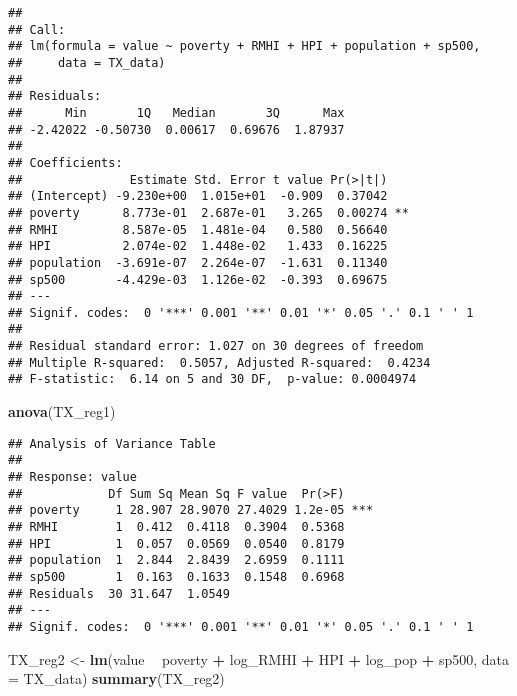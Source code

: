 \documentclass[
]{article}
\newenvironment{Shaded}{\begin{snugshade}}{\end{snugshade}}
\newcommand{\DataTypeTok}[1]{\textcolor[rgb]{0.13,0.29,0.53}{#1}}
\newcommand{\KeywordTok}[1]{\textcolor[rgb]{0.13,0.29,0.53}{\textbf{#1}}}
\newcommand{\NormalTok}[1]{#1}
\newcommand{\OperatorTok}[1]{\textcolor[rgb]{0.81,0.36,0.00}{\textbf{#1}}}
\newcommand{\StringTok}[1]{\textcolor[rgb]{0.31,0.60,0.02}{#1}}
\begin{document}
\begin{verbatim}
## 
## Call:
## lm(formula = value ~ poverty + RMHI + HPI + population + sp500, 
##     data = TX_data)
## 
## Residuals:
##      Min       1Q   Median       3Q      Max 
## -2.42022 -0.50730  0.00617  0.69676  1.87937 
## 
## Coefficients:
##               Estimate Std. Error t value Pr(>|t|)   
## (Intercept) -9.230e+00  1.015e+01  -0.909  0.37042   
## poverty      8.773e-01  2.687e-01   3.265  0.00274 **
## RMHI         8.587e-05  1.481e-04   0.580  0.56640   
## HPI          2.074e-02  1.448e-02   1.433  0.16225   
## population  -3.691e-07  2.264e-07  -1.631  0.11340   
## sp500       -4.429e-03  1.126e-02  -0.393  0.69675   
## ---
## Signif. codes:  0 '***' 0.001 '**' 0.01 '*' 0.05 '.' 0.1 ' ' 1
## 
## Residual standard error: 1.027 on 30 degrees of freedom
## Multiple R-squared:  0.5057, Adjusted R-squared:  0.4234 
## F-statistic:  6.14 on 5 and 30 DF,  p-value: 0.0004974
\end{verbatim}

\begin{Shaded}
\begin{Highlighting}[]
\KeywordTok{anova}\NormalTok{(TX_reg1)}
\end{Highlighting}
\end{Shaded}

\begin{verbatim}
## Analysis of Variance Table
## 
## Response: value
##            Df Sum Sq Mean Sq F value  Pr(>F)    
## poverty     1 28.907 28.9070 27.4029 1.2e-05 ***
## RMHI        1  0.412  0.4118  0.3904  0.5368    
## HPI         1  0.057  0.0569  0.0540  0.8179    
## population  1  2.844  2.8439  2.6959  0.1111    
## sp500       1  0.163  0.1633  0.1548  0.6968    
## Residuals  30 31.647  1.0549                    
## ---
## Signif. codes:  0 '***' 0.001 '**' 0.01 '*' 0.05 '.' 0.1 ' ' 1
\end{verbatim}

\begin{Shaded}
\begin{Highlighting}[]
\NormalTok{TX_reg2 <-}\StringTok{ }\KeywordTok{lm}\NormalTok{(value }\OperatorTok{~}\StringTok{ }\NormalTok{poverty }\OperatorTok{+}\StringTok{ }\NormalTok{log_RMHI }\OperatorTok{+}\StringTok{ }\NormalTok{HPI }\OperatorTok{+}\StringTok{ }\NormalTok{log_pop }\OperatorTok{+}\StringTok{ }\NormalTok{sp500, }\DataTypeTok{data =}\NormalTok{ TX_data)}
\KeywordTok{summary}\NormalTok{(TX_reg2)}
\end{Highlighting}
\end{Shaded}
\end{document}
